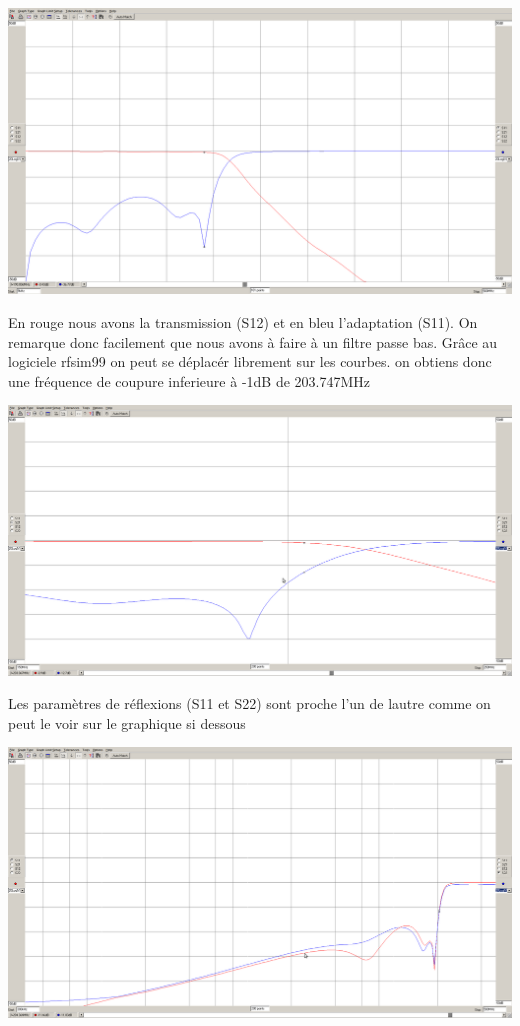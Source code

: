 \documentclass[a4paper,12pt]{report}            %
\begin{document}
\begin{center}\includegraphics[scale = 0.25]{pic/parametre_passe_bas.png}\\ \end{center}
En rouge nous avons la transmission (S12) et en bleu l'adaptation (S11). On remarque donc facilement que nous avons
à faire à un filtre passe bas. Grâce au logiciele rfsim99 on peut se déplacér librement sur les courbes.
on obtiens donc une fréquence de coupure inferieure à -1dB de 203.747MHz
\begin{center}\includegraphics[scale = 0.25]{pic/freq_coupure_pb.png}\\ \end{center}
Les paramètres de réflexions (S11 et S22) sont proche l'un de lautre comme on peut le voir sur le
graphique si dessous
\begin{center}\includegraphics[scale = 0.25]{pic/reflexion_pb.png}\\ \end{center}
\end{document}
